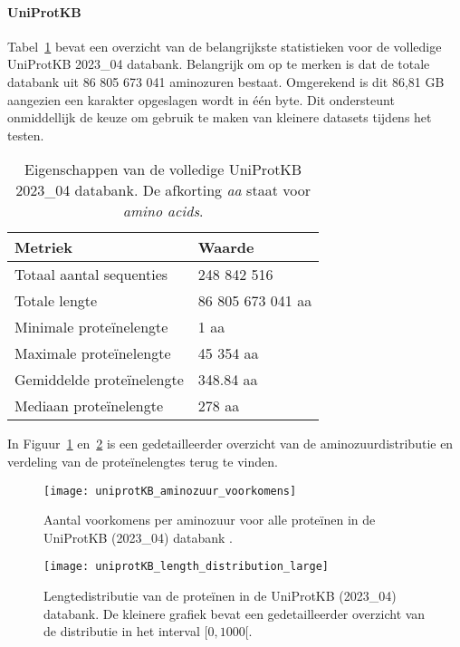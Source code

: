\paragraph{UniProtKB}
Tabel~\ref{tab:uniprotKB_eigenschappen} bevat een overzicht van de belangrijkste statistieken voor de volledige UniProtKB 2023\_04 databank.
Belangrijk om op te merken is dat de totale databank uit 86 805 673 041 aminozuren bestaat.
Omgerekend is dit 86,81 GB aangezien een karakter opgeslagen wordt in één byte.
Dit ondersteunt onmiddellijk de keuze om gebruik te maken van kleinere datasets tijdens het testen.

\begin{table}[h!]
    \centering
    \begin{tabular}{ l l }
        Metriek                   & Waarde            \\
        \hline\hline
        Totaal aantal sequenties  & 248 842 516       \\
        Totale lengte             & 86 805 673 041 aa \\
        Minimale proteïnelengte   & 1 aa              \\
        Maximale proteïnelengte   & 45 354 aa         \\
        Gemiddelde proteïnelengte & 348.84 aa         \\
        Mediaan proteïnelengte    & 278 aa            \\
        \hline
    \end{tabular}
    \caption{Eigenschappen van de volledige UniProtKB 2023\_04 databank. De afkorting \textit{aa} staat voor \textit{amino acids}.}
    \label{tab:uniprotKB_eigenschappen}
\end{table}

In Figuur~\ref{fig:uniprot_aminozuur} en~\ref{fig:uniprot_length} is een gedetailleerder overzicht van de aminozuurdistributie en verdeling van de proteïnelengtes terug te vinden.

\begin{figure}[h]
    \centering
    \texttt{[image: uniprotKB\_aminozuur\_voorkomens]}
    \caption{Aantal voorkomens per aminozuur voor alle proteïnen in de UniProtKB (2023\_04) databank .}
    \label{fig:uniprot_aminozuur}
\end{figure}

\begin{figure}[h]
    \centering
    \texttt{[image: uniprotKB\_length\_distribution\_large]}
    \caption{Lengtedistributie van de proteïnen in de UniProtKB (2023\_04) databank. De kleinere grafiek bevat een gedetailleerder overzicht van de distributie in het interval $[0, 1000[$.}\label{fig:uniprot_length}
\end{figure}

